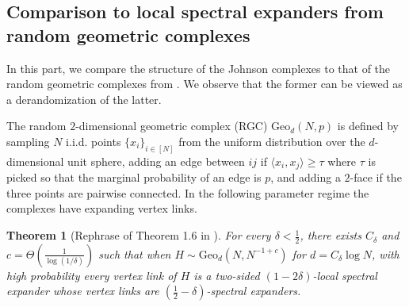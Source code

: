 \documentclass[10pt,a4paper]{article}
\newcommand{\prettyref}[1]{\cref{#1}}
\newtheorem{theorem}{Theorem}[section]
\theoremstyle{definition}
\theoremstyle{remark}
\newtheorem{remark}[theorem]{Remark}
\newcommand\sett[2]{\left\{ #1 \left| \; \vphantom{#1 #2} \right. #2  \right\}}
\newcommand{\iprod}[1]{\langle#1\rangle}
\renewcommand{\ge}{\geqslant}
\numberwithin{equation}{section}
\let\pref=\prettyref
\def\Y{Y}
\begin{document}

\subsection{Comparison to local spectral expanders from random geometric complexes}
In this part, we compare the structure of the Johnson complexes to that of the random geometric complexes from \cite{LiuMSY2023}. 
We observe that the former can be viewed as a derandomization of the latter.



The random $2$-dimensional geometric complex (RGC) $\mathrm{Geo}_d(N,p)$ is defined by sampling $N$ i.i.d. points $\{x_i\}_{i\in[N]}$ from the uniform distribution over the $d$-dimensional unit sphere, adding an edge between $ij$ if $\iprod{x_i,x_j} \ge \tau$ where $\tau$ is picked so that the marginal probability of an edge is $p$, and adding a $2$-face if the three points are pairwise connected. In the following parameter regime the complexes have expanding vertex links.

\begin{theorem}[Rephrase of Theorem 1.6 in \cite{LiuMSY2023}]
For every $\delta < \frac{1}{2}$, there exists $C_\delta$ and $c = \Theta\left(\frac{1}{\log (1/\delta)}\right)$ such that when $H \sim \mathrm{Geo}_d(N,N^{-1+c})$ for $d = C_\delta \log N$, with high probability every vertex link of $H$ is a two-sided $(1-2\delta)$-local spectral expander whose vertex links are $\left(\frac{1}{2} - \delta\right)$-spectral expanders.
\end{theorem}
\end{document}
